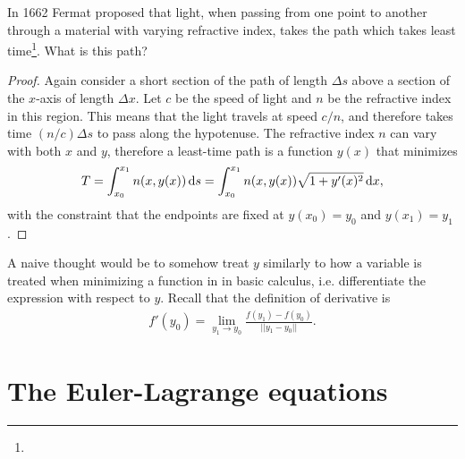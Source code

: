 \begin{question*}
  In 1662 Fermat proposed that light, when passing from one point to another through a material with varying
  refractive index, takes the path which takes least time\footnote{}. What is this path?
\end{question*}

\begin{proof}
  Again consider a short section of the path of length $\Delta s$ above a section of the $x$-axis of
  length $\Delta x$. Let $c$ be the speed of light and $n$ be the refractive index in this region. This means
  that the light travels at speed $c/n$, and therefore takes time $(n/c)\Delta s$ to pass along the
  hypotenuse. The refractive index $n$ can vary with both $x$ and $y$, therefore a least-time path is a
  function $y(x)$ that minimizes
  \begin{align*}
    T = \int_{x_0}^{x_1} n(x, y(x)) \d s = \int_{x_0}^{x_1} n(x, y(x)) \sqrt{1 + y'(x)^2} \dx,
  \end{align*}
  with the constraint that the endpoints are fixed at $y(x_0) = y_0$ and $y(x_1) = y_1$.

\end{proof}

A naive thought would be to somehow treat $y$ similarly to how a variable is treated when minimizing a function
in in basic calculus, i.e. differentiate the expression with respect to $y$. Recall that the definition of
derivative is
\begin{align*}
  f'(y_0) = \lim_{y_1 \to y_0}\frac{f(y_1) - f(y_0)}{||y_1 - y_0||}.
\end{align*}


\section{The Euler-Lagrange equations}

